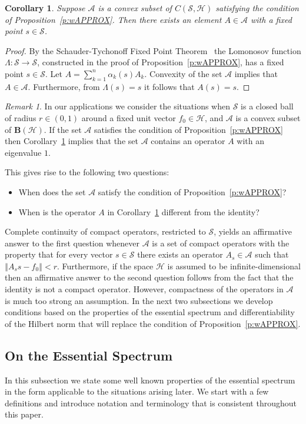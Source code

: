 \documentclass{tran-l}
\newtheorem{cor}[thm]{Corollary}
\theoremstyle{definition}
\theoremstyle{remark}
\newtheorem{rem}[thm]{Remark}
\numberwithin{equation}{subsection}
\newcommand{\To}{\longrightarrow}
\newcommand{\h}{\mathcal{H}}
\newcommand{\s}{\mathcal{S}}
\newcommand{\A}{\mathcal{A}}
\newcommand{\BH}{\mathbf{B}(\mathcal{H})}
\newcommand{\norm}[1]{\left\Vert#1\right\Vert}
\begin{document}
\begin{cor} \label{c:wAPPROX}
Suppose $\A$ is a convex subset of $C(\s,\h)$ satisfying the condition of Proposition~\ref{p:wAPPROX}. Then there exists an element $A\in\A$ with a fixed point $s\in\s$.
\end{cor}

\begin{proof}
By the Schauder-Tychonoff Fixed Point Theorem~\cite[p.~456]{DS57} the Lomonosov function $\Lambda\colon\s\To\s$, constructed in the proof of Proposition~\ref{p:wAPPROX}, has a fixed point $s\in\s$. Let $A=\sum_{k=1}^n\alpha_k(s)A_k$. Convexity of the set $\A$ implies that $A\in\A$. Furthermore, from $\Lambda(s)=s$ it follows that $A(s)=s$.
\end{proof}

\begin{rem}
In our applications we consider the situations when $\s$ is a closed ball of radius $r\in(0,1)$ around a fixed unit vector $f_0\in\h$, and $\A$ is a convex subset of $\BH$. If the set $\A$ satisfies the condition of Proposition~\ref{p:wAPPROX} then Corollary~\ref{c:wAPPROX} implies that the set $\A$ contains an operator $A$ with an eigenvalue $1$.

This gives rise to the following two questions:
\begin{itemize}
  \item{When does the set $\A$ satisfy the condition of Proposition~\ref{p:wAPPROX}?}
  \item{When is the operator $A$ in Corollary~\ref{c:wAPPROX} different from the identity?}
\end{itemize}

Complete continuity of compact operators, restricted to $\s$, yields an affirmative answer to the first question whenever $\A$ is a set of compact operators with the property that for every vector $s\in\s$ there exists an operator $A_s\in\A$ such that $\norm{A_s{s}-f_0}<r$. Furthermore, if the space $\h$ is assumed to be infinite-dimensional then an affirmative answer to the second question follows from the fact that the identity is not a compact operator. However, compactness of the operators in $\A$ is much too strong an assumption. In the next two subsections we develop conditions based on the properties of the essential spectrum and differentiability of the Hilbert norm that will replace the condition of Proposition~\ref{p:wAPPROX}.
\end{rem}

\subsection{On the Essential Spectrum}
In this subsection we state some well known properties of the essential spectrum in the form applicable to the situations arising later. We start with a few definitions and introduce notation and terminology that is consistent throughout this paper.
\end{document}
